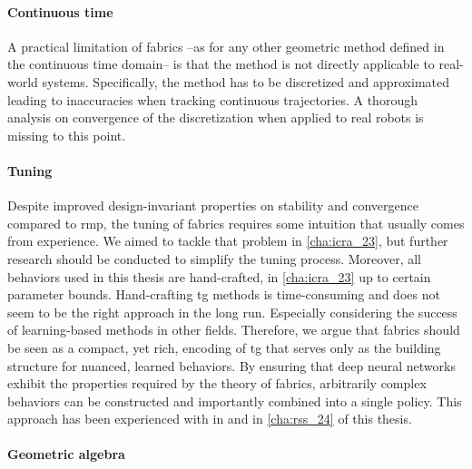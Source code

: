 \paragraph{Continuous time}
\label{par:discussion_continuous_time}

A practical limitation of \ac{fabrics} --as for any other
geometric method defined in the continuous time domain--
is that the method is not directly applicable to real-world
systems. Specifically, the method has to be discretized and
approximated leading to inaccuracies when tracking continuous
trajectories. A thorough analysis on convergence of the discretization
when applied to real robots is missing to this point.

\paragraph{Tuning}
\label{par:discussion_tuning}

Despite improved design-invariant properties on stability
and convergence compared to \ac{rmp}, the tuning of \ac{fabrics} requires some
intuition that usually comes from experience. We aimed to
tackle that problem in \cref{cha:icra_23}, but further
research should be conducted to simplify the tuning process.
Moreover, all behaviors used in this thesis are
hand-crafted, in \cref{cha:icra_23} up to certain
parameter bounds. Hand-crafting \ac{tg} methods is time-consuming
and does not seem to be the right approach in the long run.
Especially considering the success of learning-based methods
in other fields. Therefore, we argue that \ac{fabrics}
should be seen as a compact, yet rich, encoding of
\ac{tg} that serves only as the building structure for
nuanced, learned behaviors. By ensuring that deep neural
networks exhibit the properties required by the theory of 
\ac{fabrics}, arbitrarily complex behaviors can be
constructed and importantly combined into a single policy.
This approach has been experienced with in \cite{xie2023neural}
and in \cref{cha:rss_24} of this thesis.

\paragraph{Geometric algebra}
\label{par:discussion_geometric_algebra}

